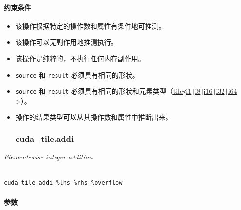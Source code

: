 \documentclass{article}
\begin{document}
\paragraph{约束条件}


\begin{itemize}
\item 该操作根据特定的操作数和属性有条件地可推测。
\item 该操作可以无副作用地推测执行。
\item 该操作是纯粹的，不执行任何内存副作用。
\item \texttt{source} 和 \texttt{result} 必须具有相同的形状。
\item \texttt{source} 和 \texttt{result} 必须具有相同的形状和元素类型（\href{https://docs.nvidia.com/cuda/tile-ir/latest/sections/types.html#type-tile}{tile}\texttt{<}\href{https://docs.nvidia.com/cuda/tile-ir/latest/sections/types.html#subsection-element-types}{i1}\texttt{|}\href{https://docs.nvidia.com/cuda/tile-ir/latest/sections/types.html#subsection-element-types}{i8}\texttt{|}\href{https://docs.nvidia.com/cuda/tile-ir/latest/sections/types.html#subsection-element-types}{i16}\texttt{|}\href{https://docs.nvidia.com/cuda/tile-ir/latest/sections/types.html#subsection-element-types}{i32}\texttt{|}\href{https://docs.nvidia.com/cuda/tile-ir/latest/sections/types.html#subsection-element-types}{i64} >）。
\item 操作的结果类型可以从其操作数和属性中推断出来。




\subsubsection{cuda\_tile.addi}


\end{itemize}
\textit{Element-wise integer addition}




\begin{lstlisting}

cuda_tile.addi %lhs %rhs %overflow

\end{lstlisting}



\paragraph{参数}
\end{document}
